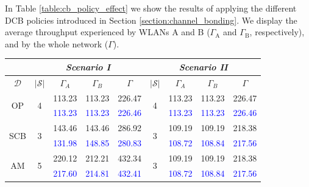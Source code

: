 \documentclass[a4paper]{article}
\begin{document}
	In Table \ref{table:cb_policy_effect} we show the results of applying the different DCB policies introduced in Section \ref{section:channel_bonding}. We display the average throughput experienced by WLANs A and B ($\Gamma_\text{A}$ and $\Gamma_\text{B}$, respectively), and by the whole network ($\Gamma$).
	\begin{table}[h]
		\centering
			\setlength\tabcolsep{1.5pt} %
			\begin{tabular}{c|c|c|c|c|c|c|c|c|}
				\cline{2-9}
				& \multicolumn{4}{c|}{\textit{Scenario I}}                                  & \multicolumn{4}{c|}{\textit{Scenario II}}                                \\ \hline
				\multicolumn{1}{|c|}{$\mathcal{D}$}                    & $|\mathcal{S}|$              & $\Gamma_A$ & $\Gamma_B$ & $\Gamma$ & $|\mathcal{S}|$             & $\Gamma_A$ & $\Gamma_B$ & $\Gamma$ \\ \hline
				
				\multicolumn{1}{|c|}{\multirow{2}{*}{OP}}  & \multirow{2}{*}{4}  & 113.23     & 113.23     & 226.47   & \multirow{2}{*}{4} & 113.23     & 113.23     & 226.47   \\  
				\multicolumn{1}{|c|}{}                     &                     & \textcolor{blue}{113.23}     & \textcolor{blue}{113.23}     & \textcolor{blue}{226.46}   &                    & \textcolor{blue}{113.23}     & \textcolor{blue}{113.23}     & \textcolor{blue}{226.46}   \\ \hline
				
				\multicolumn{1}{|c|}{\multirow{2}{*}{SCB}} & \multirow{2}{*}{3}  & 143.46     & 143.46     & 286.92   & \multirow{2}{*}{3} & 109.19     & 109.19     & 218.38   \\
				\multicolumn{1}{|c|}{}                     &                     & \textcolor{blue}{131.98}     & \textcolor{blue}{148.85}     & \textcolor{blue}{280.83}   &                    & \textcolor{blue}{108.72}     & \textcolor{blue}{108.84}     & \textcolor{blue}{217.56}   \\ \hline
	
				\multicolumn{1}{|c|}{\multirow{2}{*}{AM}}  & \multirow{2}{*}{5}  & 220.12     & 212.21     & 432.34   & \multirow{2}{*}{3} & 109.19     & 109.19     & 218.38   \\ 
				\multicolumn{1}{|c|}{}                     &                     & \textcolor{blue}{217.60}     & \textcolor{blue}{214.81}     & \textcolor{blue}{432.41}   &                    & \textcolor{blue}{108.72}     & \textcolor{blue}{108.84}     & \textcolor{blue}{217.56}   \\ \hline
				

\end{tabular}
\end{table}
\end{document}
